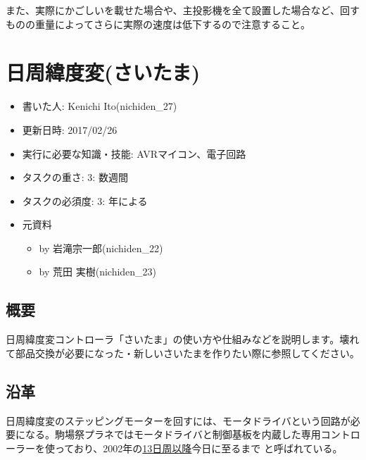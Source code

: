 \documentclass[letterpaper,10pt,dvipdfmx]{sphinxmanual}
\begin{document}
また、実際にかごしいを載せた場合や、主投影機を全て設置した場合など、回すものの重量によってさらに実際の速度は低下するので注意すること。


\chapter{日周緯度変(さいたま)}
\label{\detokenize{nissyu-idohen/saitama:}}\label{\detokenize{nissyu-idohen/saitama::doc}}\label{\detokenize{nissyu-idohen/saitama:id1}}\begin{itemize}
\item {} 
書いた人: Kenichi Ito(nichiden\_27)

\item {} 
更新日時: 2017/02/26

\item {} 
実行に必要な知識・技能: AVRマイコン、電子回路

\item {} 
タスクの重さ: 3: 数週間

\item {} 
タスクの必須度: 3: 年による

\item {} 
元資料
\begin{itemize}
\item {} 
 by 岩滝宗一郎(nichiden\_22)

\item {} 
 by 荒田 実樹(nichiden\_23)

\end{itemize}

\end{itemize}


\section{概要}
\label{\detokenize{nissyu-idohen/saitama:}}\label{\detokenize{nissyu-idohen/saitama:id2}}
日周緯度変コントローラ「さいたま」の使い方や仕組みなどを説明します。壊れて部品交換が必要になった・新しいさいたまを作りたい際に参照してください。


\section{沿革}
\label{\detokenize{nissyu-idohen/saitama:}}\label{\detokenize{nissyu-idohen/saitama:id3}}
日周緯度変のステッピングモーターを回すには、モータドライバという回路が必要になる。駒場祭プラネではモータドライバと制御基板を内蔵した専用コントローラーを使っており、2002年の\href{http://twitter.com/fujita\_d\_h/status/254087988882046976}{13日周以降}今日に至るまで と呼ばれている。
\end{document}
